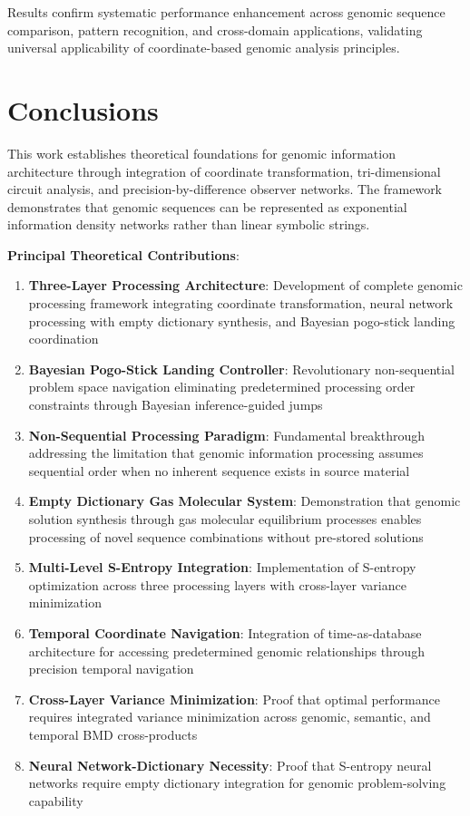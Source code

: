 \documentclass[12pt,a4paper]{article}
\begin{document}
\begin{table}[H]
Results confirm systematic performance enhancement across genomic sequence comparison, pattern recognition, and cross-domain applications, validating universal applicability of coordinate-based genomic analysis principles.

\section{Conclusions}

This work establishes theoretical foundations for genomic information architecture through integration of coordinate transformation, tri-dimensional circuit analysis, and precision-by-difference observer networks. The framework demonstrates that genomic sequences can be represented as exponential information density networks rather than linear symbolic strings.

\textbf{Principal Theoretical Contributions}:

\begin{enumerate}
\item \textbf{Three-Layer Processing Architecture}: Development of complete genomic processing framework integrating coordinate transformation, neural network processing with empty dictionary synthesis, and Bayesian pogo-stick landing coordination
\item \textbf{Bayesian Pogo-Stick Landing Controller}: Revolutionary non-sequential problem space navigation eliminating predetermined processing order constraints through Bayesian inference-guided jumps
\item \textbf{Non-Sequential Processing Paradigm}: Fundamental breakthrough addressing the limitation that genomic information processing assumes sequential order when no inherent sequence exists in source material
\item \textbf{Empty Dictionary Gas Molecular System}: Demonstration that genomic solution synthesis through gas molecular equilibrium processes enables processing of novel sequence combinations without pre-stored solutions
\item \textbf{Multi-Level S-Entropy Integration}: Implementation of S-entropy optimization across three processing layers with cross-layer variance minimization
\item \textbf{Temporal Coordinate Navigation}: Integration of time-as-database architecture for accessing predetermined genomic relationships through precision temporal navigation
\item \textbf{Cross-Layer Variance Minimization}: Proof that optimal performance requires integrated variance minimization across genomic, semantic, and temporal BMD cross-products
\item \textbf{Neural Network-Dictionary Necessity}: Proof that S-entropy neural networks require empty dictionary integration for genomic problem-solving capability
\end{enumerate}


\end{table}
\end{document}
